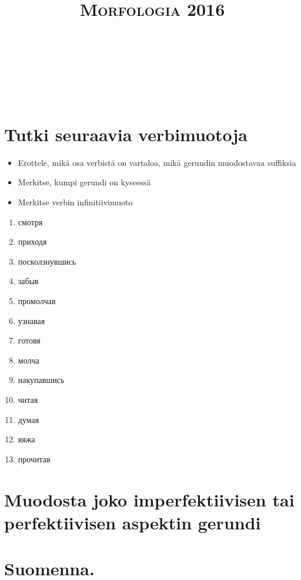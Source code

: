 \documentclass[paper=a4, fontsize=11pt]{scrartcl}
\title{	
\normalfont \normalsize 
\textsc{Morfologia 2016} \\ [25pt] %
\horrule{0.5pt} \\[0.4cm] %
\huge  \\ %
\horrule{2pt} \\[0.5cm] %
}
\date{} %
\begin{document}
\section{Tutki seuraavia verbimuotoja}

\begin{itemize}
    \item Erottele, mikä osa verbistä on vartaloa, mikä gerundin muodostavaa suffiksia
    \item Merkitse, kumpi gerundi on kyseessä
    \item Merkitse verbin infinitiivimuoto
\end{itemize}

\begin{enumerate}
    \item смотря
    \item приходя
    \item посколзнувшись
    \item забыв
    \item промолчав
    \item узнавая
    \item готовя
    \item молча
    \item накупавшись
    \item читая
    \item думая
    \item вяжа
    \item прочитав
\end{enumerate}

\section{Muodosta joko imperfektiivisen tai perfektiivisen aspektin gerundi}

\section{Suomenna.}
\end{document}
